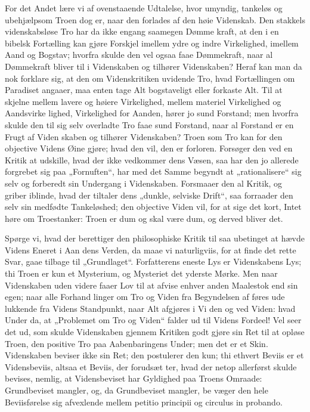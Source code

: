 \documentclass[12pt]{book}
\newcommand{\opage}[1]{\marginnote{\footnotesize\textit{[#1]}}}
\begin{document}
For det Andet lære vi af ovenstaaende Udtalelse,
hvor umyndig, tankeløs og ubehjælpsom Troen dog er,
naar den forlades af den høie Videnskab. Den stakkels
videnskabsløse Tro har da ikke engang saamegen Dømme\-%
kraft, at den i en bibelsk Fortælling kan gjøre Forskjel
imellem ydre og indre Virkelighed, imellem Aand og
Bogstav; hvorfra skulde den vel ogsaa faae Dømmekraft,
naar al Dømmekraft bliver til i Videnskaben og tilhører
Videnskaben? Heraf kan man da nok forklare sig, at
den om Videnskritiken uvidende Tro, hvad Fortællingen
om Paradiset angaaer, maa enten tage Alt bogstaveligt
eller forkaste Alt. Til at skjelne mellem lavere og høiere
Virkelighed, mellem materiel Virkelighed og Aandsvirke\-%
lighed, Virkelighed for Aanden, hører jo sund Forstand;
men hvorfra skulde den til sig selv overladte Tro faae
sund Forstand, naar al Forstand er en Frugt af Viden\-%
skaben og tilhører Videnskaben? Troen som Tro kan
for den objective Videns Øine gjøre; hvad den vil,
den er forloren. Forsøger den ved en Kritik at udskille,
hvad der ikke vedkommer dens Væsen, saa har den jo
allerede forgrebet sig paa „Fornuften“, har med det
Samme begyndt at „rationalisere“ sig selv og forberedt
sin Undergang i Videnskaben. Forsmaaer den al Kritik,
og griber iblinde, hvad der tiltaler dens „dunkle, selviske
Drift“, saa forraader den selv sin medfødte Tankeløshed;
den objective Viden vil, for at sige det kort, Intet høre
om Troestanker: Troen er dum og skal være dum, og
derved bliver det.

Spørge vi, hvad der berettiger den philosophiske
Kritik til saa ubetinget at hævde Videns Eneret i Aan\-%
dens Verden, da maae vi naturligviis, for at finde det
rette Svar, gaae tilbage til „Grundlaget“. Forfatterens
\opage{8}\setcounter{footnote}{0}%
eneste Lys er Videnskabens Lys; thi Troen er kun et
Mysterium, og Mysteriet det yderste Mørke. Men naar
Videnskaben uden videre faaer Lov til at afvise enhver
anden Maalestok end sin egen; naar alle Forhand\-%
linger om Tro og Viden fra Begyndelsen af føres ude\-%
lukkende fra Videns Standpunkt, naar Alt afgjøres i Vi\-%
den og ved Viden: hvad Under da, at „Problemet om
Tro og Viden“ falder ud til Videns Fordeel! Vel seer
det ud, som skulde Videnskaben gjennem Kritiken godt\-%
gjøre sin Ret til at opløse Troen, den positive Tro paa
Aabenbaringens Under; men det er et Skin. Videnskaben
beviser ikke sin Ret; den postulerer den kun; thi ethvert
Beviis er et Vidensbeviis, altsaa et Beviis, der forudsæt\-%
ter, hvad der netop allerførst skulde bevises, nemlig, at
Vidensbeviset har Gyldighed paa Troens Omraade:
Grundbeviset mangler, og, da Grundbeviset mangler, be\-%
væger den hele Beviisførelse sig afvexlende mellem petitio
principii og circulus in probando.
\end{document}
